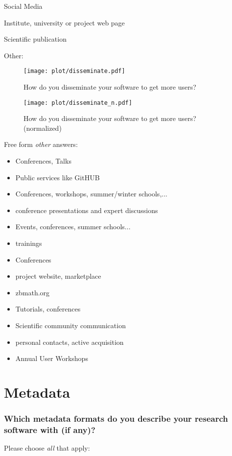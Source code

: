 \documentclass[headsepline,titlepage,twoside,12pt,toc=flat,headings=normal]{scrreprt}
\newcommand{\question}[1]{\subsubsection{#1}}
\newcommand{\otherbox}{\fbox{\phantom{This is how big an answer would be.}}}
\begin{document}
\begin{answers}
\item Social Media
\item Institute, university or project web page
\item Scientific publication
\item Other: \otherbox
\end{answers}

\begin{figure}[h!]
\caption{How do you disseminate your software to get more users?}
\label{fig:disseminate}
\texttt{[image: plot/disseminate.pdf]}
\end{figure}

\begin{figure}[h!]
\caption{How do you disseminate your software to get more users? (normalized)}
\label{fig:disseminate_n}
\texttt{[image: plot/disseminate\_n.pdf]}
\end{figure}

Free form \emph{other} answers:
\begin{itemize}
\item Conferences, Talks
\item Public services like GitHUB
\item Conferences, workshops, summer/winter schools,...
\item conference presentations and expert discussions
\item Events, conferences, summer schools...
\item trainings
\item Conferences
\item project website, marketplace
\item zbmath.org
\item Tutorials, conferences
\item Scientific community communication
\item personal contacts, active acquisition
\item Annual User Workshops
\end{itemize}

\section{Metadata}
\question{Which metadata formats do you describe your research software with (if any)?}\label{which-metadata-formats-do-you-describe-your-research-software-with-if-any}
Please choose \emph{all} that apply:
\end{document}
